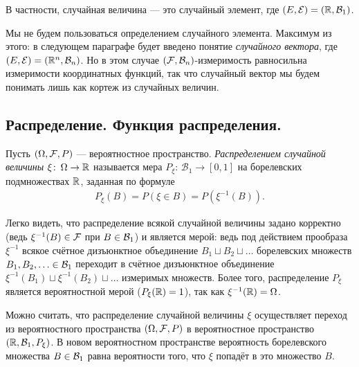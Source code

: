 \documentclass[../main.tex]{subfiles}
\begin{document}
В частности, случайная величина --- это случайный элемент, где $ (E,\mathcal E) = (\mathbb{R}, \mathcal B_1) $.

Мы не будем пользоваться определением случайного элемента. Максимум из этого: в следующем параграфе будет введено понятие \textit{случайного вектора}, где $ (E, \mathcal E) = (\mathbb{R}^{n}, \mathcal B_n) $. Но в этом случае $ (\mathcal F,\mathcal B_n) $-измеримость равносильна измеримости координатных функций, так что случайный вектор мы будем понимать лишь как кортеж из случайных величин.

\subsection{Распределение. Функция распределения.}

\begin{df}
 Пусть $ (\Omega,\mathcal F,P) $ --- вероятностное пространство.
 \textit{Распределением случайной величины} $\xi \colon\,\Omega\to\mathbb{R}$ называется мера $ P_{\xi} \colon\, \mathcal B_1 \to [0, 1] $ на борелевских подмножествах $\mathbb{R}$, заданная по формуле
 \begin{align*}
  P_{\xi}(B) = P(\xi \in B) = P(\xi^{-1}(B)).
 \end{align*} 
\end{df}

\begin{remrk}
 Легко видеть, что распределение всякой случайной величины задано корректно (ведь $ \xi^{-1}(B) \in \mathcal F $ при $ B \in \mathcal B_1 $) и является мерой: ведь под действием прообраза $ \xi^{-1} $ всякое счётное дизъюнктное объединение $ B_1 \sqcup B_2 \sqcup \ldots $ борелевских множеств $ B_1, B_2, \ldots \in \mathcal B_1 $ переходит в счётное дизъюнктное объединение $ \xi^{-1}(B_1) \sqcup \xi^{-1}(B_2) \sqcup \ldots $ измеримых множеств. Более того, распределение $ P_\xi $ является вероятностной мерой ($ P_\xi(\mathbb{R}) = 1 $), так как $ \xi^{-1}(\mathbb{R}) = \Omega $.
\end{remrk}

\begin{remrk}
 Можно считать, что распределение случайной величины $ \xi $ осуществляет переход из вероятностного пространства $ (\Omega,\mathcal F,P) $ в вероятностное пространство $ (\mathbb{R},\mathcal B_1,P_\xi) $. В новом вероятностном пространстве вероятность борелевского множества $ B \in \mathcal B_1 $ равна вероятности того, что $ \xi $ попадёт в это множество $ B $.
\end{remrk}
\end{document}
